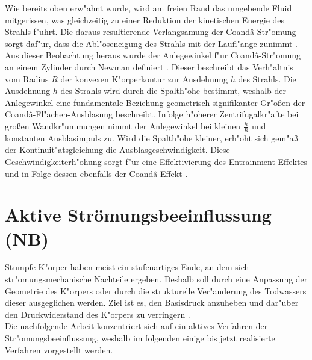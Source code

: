 Wie bereits oben erw"ahnt wurde, wird am freien Rand das umgebende Fluid mitgerissen, was gleichzeitig zu einer Reduktion der kinetischen Energie des Strahls f"uhrt. Die daraus resultierende Verlangsamung der Coand\^{a}-Str"omung sorgt daf"ur, dass die Abl"oseneigung des Strahls mit der Laufl"ange zunimmt \cite{Fischer.2011}. Aus dieser Beobachtung heraus wurde der Anlegewinkel f"ur Coand\^{a}-Str"omung an einem Zylinder durch Newman definiert \cite{Newman.1961}. Dieser beschreibt das Verh"altnis vom Radius $R$ der konvexen K"orperkontur zur Ausdehnung $h$ des Strahls. Die Ausdehnung $h$ des Strahls wird durch die Spalth"ohe bestimmt, weshalb der Anlegewinkel eine fundamentale Beziehung geometrisch signifikanter Gr"o\ss{}en der Coand\^{a}-Fl"achen-Ausblasung beschreibt. Infolge h"oherer Zentrifugalkr"afte bei gro\ss{}en Wandkr"ummungen nimmt der Anlegewinkel bei kleinen $\frac{h}{R}$ und konstanten Ausblasimpuls zu. Wird die Spalth"ohe kleiner, erh"oht sich gem"a\ss{} der Kontinuit"atsgleichung die Ausblasgeschwindigkeit. Diese Geschwindigkeiterh"ohung sorgt f"ur eine Effektivierung des Entrainment-Effektes und in Folge dessen ebenfalls der Coand\^{a}-Effekt \cite{Fischer.2011}.






\newpage
\section{Aktive Str\"omungsbeeinflussung (NB)}

Stumpfe K"orper haben meist ein stufenartiges Ende, an dem sich str"omungsmechanische Nachteile ergeben. Deshalb soll durch eine Anpassung der Geometrie des K"orpers oder durch die strukturelle Ver"anderung des Todwassers dieser ausgeglichen werden. Ziel ist es, den Basisdruck anzuheben und dar"uber den Druckwiderstand des K"orpers zu verringern \cite{Hucho.2011}.\\
Die nachfolgende Arbeit konzentriert sich auf ein aktives Verfahren der Str"omungsbeeinflussung, weshalb im folgenden einige bis jetzt realisierte Verfahren vorgestellt werden.\\

